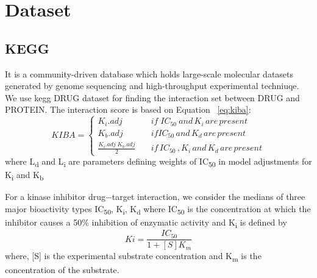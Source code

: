 \section{Dataset}

\subsection{KEGG}
It is a community-driven database which holds large-scale molecular datasets generated by genome sequencing and high-throughput experimental techniuqe.\cite{Kanehisa2000} We use \acrshort{kegg} DRUG dataset for finding the interaction set between DRUG and PROTEIN. The interaction score is based on Equation ~\ref{eq:kiba}:
\begin{equation}[ht]
  KIBA = \begin{cases}
    K_i . {adj} & \quad {if} \; {IC_{50}\: and\, K_i \,are\, present} \\
    K_b.{adj} & \quad {if}  {IC_{50} \, and \, K_d \, are \, present} \\
    \frac{K_i . {adj} \; K_b.{adj}}{2} & \quad {if\, IC_{50}\,,K_i\, and \,K_d\, are\, present}
  \end{cases}
   \label{eq:kiba}
\end{equation}
where L\textsubscript{d} and L\textsubscript{i} are parameters defining weights of IC\textsubscript{50} in model adjustments for K\textsubscript{i} and K\textsubscript{b} 

For a kinase inhibitor drug−target interaction, we consider the medians of three major bioactivity types IC\textsubscript{50}, K\textsubscript{i}, K\textsubscript{d} where
IC\textsubscript{50} \cite{Tang2013} is the concentration at which the inhibitor causes a 50\% inhibition of enzymatic activity and K\textsubscript{i} is defined by \begin{equation}
    Ki = \frac{IC_{50}} {1 + [S]  K_m}
    \label{eq:ki}
\end{equation} 
where,  [{S}] is the experimental substrate concentration and K\textsubscript{m} is the concentration of the substrate.

